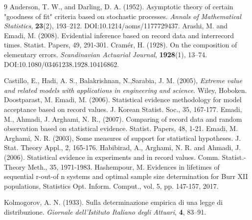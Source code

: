 \documentclass[twoside]{article}
\begin{document}
\begin{thebibliography}{9}
	Anderson, T. W., and Darling, D. A. (1952).
	Asymptotic theory of certain "goodness of fit" criteria based on stochastic processes.
	\textit{Annals of Mathematical Statistics}, \textbf{23}(2), 193--212.
	DOI:10.1214/aoms/1177729437.
	Arashi, M. and Emadi, M. (2008). Evidential inference based on record data and interrecord times. Statist. Papers, 49, 291-301.
	Cramér, H. (1928).
	On the composition of elementary errors.  
	\textit{Scandinavian Actuarial Journal}, \textbf{1928}(1), 13--74.
	DOI:10.1080/03461238.1928.10416862.
	
	Castillo, E., Hadi, A. S., Balakrishnan, N.,Sarabia, J. M. (2005), {\it Extreme value and related models with applications
		in engineering and science}. Wiley, Hoboken.
	Doostparast, M.  Emadi, M. (2006). Statistical evidence methodology for model acceptance based on record values. J. Korean Statist. Soc., 35, 167-177.
Emadi, M., Ahmadi, J.  Arghami, N. R., (2007). Comparing of record data and random observation based on statistical evidence. Statist. Papers, 48, 1-21.
Emadi, M.  Arghami, N. R. (2003), Some measures of support for statistical hypotheses. J. Stat. Theory Appl., 2, 165-176.
Habibirad, A., Arghami, N. R. and Ahmadi, J. (2006). Statistical evidence in experiments and in record values. Comm. Statist.-Theory Meth., 35, 1971-1983.
Hashempour, M. Evidences in lifetimes of sequential r-out-of n systems and optimal sample size determination for Burr XII populations, Statistics Opt. Inform. Comput., vol. 5, pp. 147-157, 2017.

	Kolmogorov, A. N. (1933).
	Sulla determinazione empirica di una legge di distribuzione.
	\textit{Giornale dell’Istituto Italiano degli Attuari}, \textbf{4}, 83--91.
	

\end{thebibliography}
\end{document}

